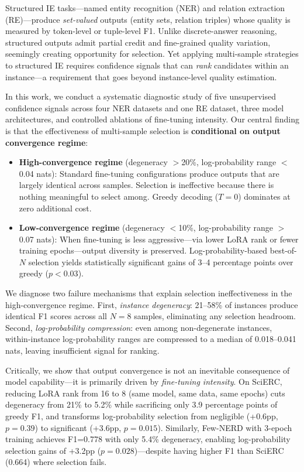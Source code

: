 \documentclass[11pt,a4paper]{article}
\begin{document}
Structured IE tasks---named entity recognition (NER) and relation extraction (RE)---produce \emph{set-valued} outputs (entity sets, relation triples) whose quality is measured by token-level or tuple-level F1.
Unlike discrete-answer reasoning, structured outputs admit partial credit and fine-grained quality variation, seemingly creating opportunity for selection.
Yet applying multi-sample strategies to structured IE requires confidence signals that can \emph{rank} candidates within an instance---a requirement that goes beyond instance-level quality estimation.

In this work, we conduct a systematic diagnostic study of five unsupervised confidence signals across four NER datasets and one RE dataset, three model architectures, and controlled ablations of fine-tuning intensity.
Our central finding is that the effectiveness of multi-sample selection is \textbf{conditional on output convergence regime}:

\begin{itemize}
\item \textbf{High-convergence regime} (degeneracy $>$20\%, log-probability range $<$0.04 nats): Standard fine-tuning configurations produce outputs that are largely identical across samples. Selection is ineffective because there is nothing meaningful to select among. Greedy decoding ($T{=}0$) dominates at zero additional cost.

\item \textbf{Low-convergence regime} (degeneracy $<$10\%, log-probability range $>$0.07 nats): When fine-tuning is less aggressive---via lower LoRA rank or fewer training epochs---output diversity is preserved. Log-probability-based best-of-$N$ selection yields statistically significant gains of 3--4 percentage points over greedy ($p<0.03$).
\end{itemize}

We diagnose two failure mechanisms that explain selection ineffectiveness in the high-convergence regime.
First, \emph{instance degeneracy}: 21--58\% of instances produce identical F1 scores across all $N{=}8$ samples, eliminating any selection headroom.
Second, \emph{log-probability compression}: even among non-degenerate instances, within-instance log-probability ranges are compressed to a median of 0.018--0.041 nats, leaving insufficient signal for ranking.

Critically, we show that output convergence is not an inevitable consequence of model capability---it is primarily driven by \emph{fine-tuning intensity}.
On SciERC, reducing LoRA rank from 16 to 8 (same model, same data, same epochs) cuts degeneracy from 21\% to 5.2\% while sacrificing only 3.9 percentage points of greedy F1, and transforms log-probability selection from negligible (+0.6pp, $p{=}0.39$) to significant (+3.6pp, $p{=}0.015$).
Similarly, Few-NERD with 3-epoch training achieves F1=0.778 with only 5.4\% degeneracy, enabling log-probability selection gains of +3.2pp ($p{=}0.028$)---despite having higher F1 than SciERC (0.664) where selection fails.
\end{document}

